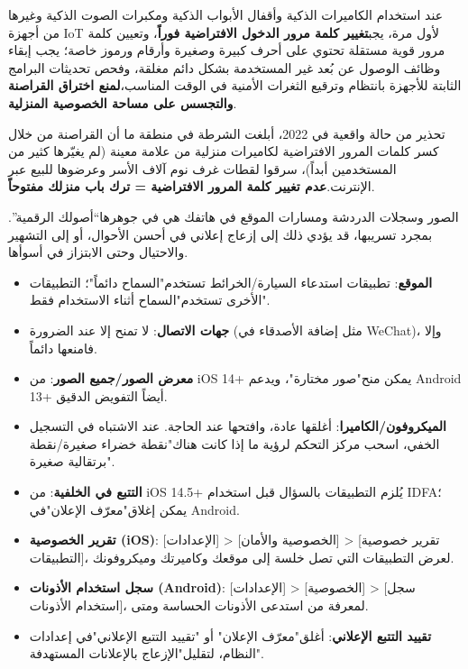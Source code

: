 
عند استخدام الكاميرات الذكية وأقفال الأبواب الذكية ومكبرات الصوت الذكية وغيرها من أجهزة IoT لأول مرة، يجب\textbf{تغيير كلمة مرور الدخول الافتراضية فوراً}، وتعيين كلمة مرور قوية مستقلة تحتوي على أحرف كبيرة وصغيرة وأرقام ورموز خاصة؛ يجب إبقاء وظائف الوصول عن بُعد غير المستخدمة بشكل دائم مغلقة، وفحص تحديثات البرامج الثابتة للأجهزة بانتظام وترقيع الثغرات الأمنية في الوقت المناسب،\textbf{لمنع اختراق القراصنة والتجسس على مساحة الخصوصية المنزلية}.

\begin{tcbwarn}{تحذير من حالة واقعية}
في 2022، أبلغت الشرطة في منطقة ما أن القراصنة من خلال كسر كلمات المرور الافتراضية لكاميرات منزلية من علامة معينة (لم يغيّرها كثير من المستخدمين أبداً)، سرقوا لقطات غرف نوم آلاف الأسر وعرضوها للبيع عبر الإنترنت.\textbf{عدم تغيير كلمة المرور الافتراضية = ترك باب منزلك مفتوحاً}.

\end{tcbwarn}


الصور وسجلات الدردشة ومسارات الموقع في هاتفك هي في جوهرها“أصولك الرقمية”. بمجرد تسريبها، قد يؤدي ذلك إلى إزعاج إعلاني في أحسن الأحوال، أو إلى التشهير والاحتيال وحتى الابتزاز في أسوأها.


\begin{itemize}
  \item \textbf{الموقع}: تطبيقات استدعاء السيارة/الخرائط تستخدم"السماح دائماً"؛ التطبيقات الأخرى تستخدم"السماح أثناء الاستخدام فقط".
  \item \textbf{جهات الاتصال}: لا تمنح إلا عند الضرورة (مثل إضافة الأصدقاء في WeChat)، وإلا فامنعها دائماً.
  \item \textbf{معرض الصور/جميع الصور}: من iOS 14+ يمكن منح"صور مختارة"، ويدعم Android 13+ أيضاً التفويض الدقيق.
  \item \textbf{الميكروفون/الكاميرا}: أغلقها عادة، وافتحها عند الحاجة. عند الاشتباه في التسجيل الخفي، اسحب مركز التحكم لرؤية ما إذا كانت هناك"نقطة خضراء صغيرة/نقطة برتقالية صغيرة".
  \item \textbf{التتبع في الخلفية}: من iOS 14.5+ يُلزم التطبيقات بالسؤال قبل استخدام IDFA؛ يمكن إغلاق"معرّف الإعلان"في Android.
\end{itemize}


\begin{itemize}
  \item \textbf{تقرير الخصوصية (iOS)}: [الإعدادات] > [الخصوصية والأمان] > [تقرير خصوصية التطبيقات]، لعرض التطبيقات التي تصل خلسة إلى موقعك وكاميرتك وميكروفونك.
  \item \textbf{سجل استخدام الأذونات (Android)}: [الإعدادات] > [الخصوصية] > [سجل استخدام الأذونات]، لمعرفة من استدعى الأذونات الحساسة ومتى.
  \item \textbf{تقييد التتبع الإعلاني}: أغلق"معرّف الإعلان" أو "تقييد التتبع الإعلاني"في إعدادات النظام، لتقليل"الإزعاج بالإعلانات المستهدفة".
\end{itemize}

